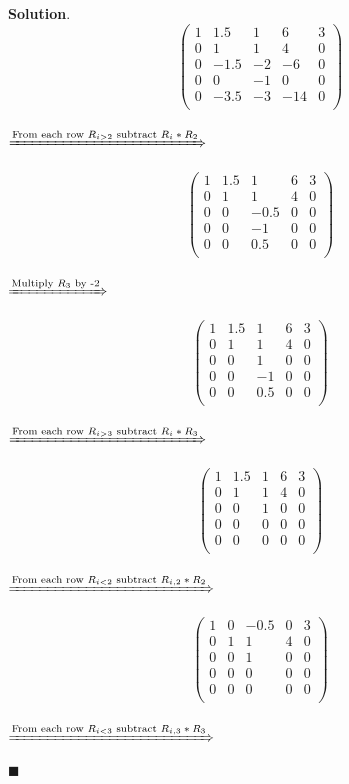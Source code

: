 \documentclass[12pt]{article}
\renewcommand{\=}[1]{\stackrel{#1}{=}} %
\theoremstyle{definition}
\newenvironment{s}{%
        \begin{trivlist} \item \textbf{Solution}. }{%
            \hspace*{\fill} $\blacksquare$\end{trivlist}}%
\begin{document}
\begin{s}
  \[
    \begin{pmatrix}
      1 & 1.5 & 1 & 6 & 3 \\
      0 & 1 & 1 & 4  & 0 \\
      0 & -1.5 & -2   & -6 & 0  \\
      0 & 0 & -1 & 0  & 0  \\
      0 & -3.5 & -3 & -14  & 0 \\
    \end{pmatrix}
  \]
  \\
  $\xRightarrow{\text{From each row $R_{i > 2}$ subtract $R_i * R_2$}}$
  
  \[
    \begin{pmatrix}
      1 & 1.5 & 1 & 6 & 3 \\
      0 & 1 & 1 & 4  & 0 \\
      0 & 0 & -0.5 & 0 & 0  \\
      0 & 0 & -1 & 0  & 0  \\
      0 & 0 & 0.5 & 0  & 0 \\
    \end{pmatrix}
  \]
  \\
  $\xRightarrow{\text{Multiply $R_3$ by -2}}$
  
  \[
    \begin{pmatrix}
      1 & 1.5 & 1 & 6 & 3 \\
      0 & 1 & 1 & 4  & 0 \\
      0 & 0 & 1 & 0 & 0  \\
      0 & 0 & -1 & 0  & 0  \\
      0 & 0 & 0.5 & 0  & 0 \\
    \end{pmatrix}
  \]
  \\
  $\xRightarrow{\text{From each row $R_{i > 3}$ subtract $R_i * R_3$}}$
  
  \[
    \begin{pmatrix}
      1 & 1.5 & 1 & 6 & 3 \\
      0 & 1 & 1 & 4  & 0 \\
      0 & 0 & 1 & 0 & 0  \\
      0 & 0 & 0 & 0  & 0  \\
      0 & 0 & 0 & 0  & 0 \\
    \end{pmatrix}
  \]
  \\
  
  $\xRightarrow{\text{From each row $R_{i < 2}$ subtract $R_{i,2} * R_2$}}$
  
  \[
    \begin{pmatrix}
      1 & 0 & -0.5 & 0 & 3 \\
      0 & 1 & 1 & 4  & 0 \\
      0 & 0 & 1 & 0 & 0  \\
      0 & 0 & 0 & 0  & 0  \\
      0 & 0 & 0 & 0  & 0 \\
    \end{pmatrix}
  \]
  \\
  $\xRightarrow{\text{From each row $R_{i < 3}$ subtract $R_{i,3} * R_3$}}$
  

\end{s}
\end{document}
